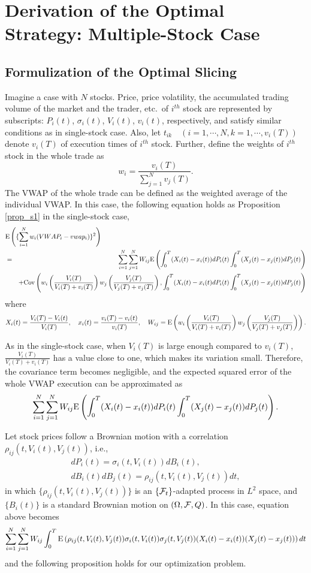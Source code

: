 \section{Derivation of the Optimal Strategy: Multiple-Stock Case}\label{sec_s4}
\subsection{Formulization of the Optimal Slicing}
Imagine a case with $N$ stocks.  Price, price volatility, the accumulated trading volume of the market and the trader, etc.\ of $i^{th}$ stock are represented by subscripts: $P_i(t)$, $\sigma_i(t)$, $V_i(t)$, $v_i(t)$, respectively, and satisfy similar conditions as in single-stock case.  Also, let $t_{ik} \quad (i=1,\cdots,N, k=1,\cdots,v_i(T))$ denote $v_i(T)$ of execution times of $i^{th}$ stock.   Further, define the weights of $i^{th}$ stock in the whole trade as
\[
   w_i=\frac{v_i(T)}{\sum_{j=1}^N v_j(T)}.
\]
The VWAP of the whole trade can be defined as the weighted average of the individual VWAP.  In this case, the following equation holds as Proposition \ref{prop_s1} in the single-stock case,
\begin{eqnarray*}
  \lefteqn{\ex{\{\sum_{i=1}^N w_i(VWAP_i-vwap_i)\}^2}} \\
  & = & \sum_{i=1}^N \sum_{j=1}^N W_{ij} \ex{\int_0^T (X_i(t)-x_i(t))dP_i(t)\int_0^T (X_j(t)-x_j(t))dP_j(t)} \\
  &   & + \cov{w_i\left(\frac{V_i(T)}{V_i(T)+v_i(T)}\right)w_j\left(\frac{V_j(T)}{V_j(T)+v_j(T)}\right)}{\int_0^T (X_i(t)-x_i(t)dP_i(t)\int_0^T (X_j(t)-x_j(t))dP_j(t)}
\end{eqnarray*}
where
\[
  X_i(t)=\frac{V_i(T)-V_i(t)}{V_i(T)}, \quad x_i(t)=\frac{v_i(T)-v_i(t)}{v_i(T)}, \quad W_{ij}={\mathrm{E}}\left( w_i\left(\frac{V_i(T)}{V_i(T)+v_i(T)}\right)w_j\left(\frac{V_j(T)}{V_j(T)+v_j(T)}\right) \right).
\]
 
As in the single-stock case, when $V_i(T)$ is large enough compared to $v_i(T)$, $\displaystyle \frac{V_i(T)}{V_i(T)+v_i(T)}$ has a value close to one, which makes its variation small.  Therefore, the covariance term becomes negligible, and the expected squared error of the whole VWAP execution can be approximated as
\[
  \displaystyle \sum_{i=1}^N \sum_{j=1}^N W_{ij} {\mathrm{E}}\left( \int_0^T (X_i(t)-x_i(t))dP_i(t)\int_0^T (X_j(t)-x_j(t))dP_j(t) \right).
\]

Let stock prices follow a Brownian motion with a correlation  $\rho_{ij}(t,V_i(t),V_j(t))$, i.e.,
\[
\begin{array}{ll}
  dP_i(t)=\sigma_i(t,V_i(t))dB_i(t),\\
  dB_i(t)dB_j(t)=\rho_{ij}(t,V_i(t),V_j(t))dt,
\end{array}
\]
in which $\{ \rho_{ij}(t,V_i(t),V_j(t)) \}$ is an $\{ {\cal F}_t \}$-adapted process in $L^2$ space,
and $\{ B_i(t) \}$ is a standard Brownian motion on $(\Omega, {\cal F}, Q)$.
In this case, equation above becomes
\begin{equation}\label{eq_s8}
  \sum_{i=1}^N \sum_{j=1}^N W_{ij} \int_0^T {\mathrm{E}}\left( \rho_{ij}(t,V_i(t),V_j(t))\sigma_i(t,V_i(t))\sigma_j(t,V_j(t))(X_i(t)-x_i(t))(X_j(t)-x_j(t)) \right)dt
\end{equation}
and the following proposition holds for our optimization problem.

